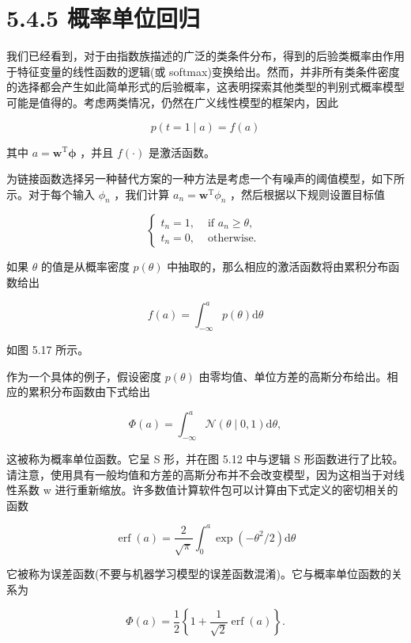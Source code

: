 \documentclass[10pt]{report}
\begin{document}
\section*{5.4.5 概率单位回归}

我们已经看到，对于由指数族描述的广泛的类条件分布，得到的后验类概率由作用于特征变量的线性函数的逻辑(或 softmax)变换给出。然而，并非所有类条件密度的选择都会产生如此简单形式的后验概率，这表明探索其他类型的判别式概率模型可能是值得的。考虑两类情况，仍然在广义线性模型的框架内，因此

\[
p\left( {t = 1 \mid  a}\right)  = f\left( a\right)  \tag{5.83}
\]

其中 \(a = {\mathbf{w}}^{\mathrm{T}}\mathbf{\phi }\) ，并且 \(f\left( \cdot \right)\) 是激活函数。

为链接函数选择另一种替代方案的一种方法是考虑一个有噪声的阈值模型，如下所示。对于每个输入 \({\phi }_{n}\) ，我们计算 \({a}_{n} = {\mathbf{w}}^{\mathrm{T}}{\phi }_{n}\) ，然后根据以下规则设置目标值

\[
\left\{  \begin{array}{ll} {t}_{n} = 1, & \text{ if }{a}_{n} \geq  \theta , \\  {t}_{n} = 0, & \text{ otherwise. } \end{array}\right.  \tag{5.84}
\]

如果 \(\theta\) 的值是从概率密度 \(p\left( \theta \right)\) 中抽取的，那么相应的激活函数将由累积分布函数给出

\[
f\left( a\right)  = {\int }_{-\infty }^{a}p\left( \theta \right) \mathrm{d}\theta  \tag{5.85}
\]

如图 5.17 所示。

作为一个具体的例子，假设密度 \(p\left( \theta \right)\) 由零均值、单位方差的高斯分布给出。相应的累积分布函数由下式给出

\[
\Phi \left( a\right)  = {\int }_{-\infty }^{a}\mathcal{N}\left( {\theta  \mid  0,1}\right) \mathrm{d}\theta , \tag{5.86}
\]

这被称为概率单位函数。它呈 S 形，并在图 5.12 中与逻辑 S 形函数进行了比较。请注意，使用具有一般均值和方差的高斯分布并不会改变模型，因为这相当于对线性系数 w 进行重新缩放。许多数值计算软件包可以计算由下式定义的密切相关的函数

\[
\operatorname{erf}\left( a\right)  = \frac{2}{\sqrt{\pi }}{\int }_{0}^{a}\exp \left( {-{\theta }^{2}/2}\right) \mathrm{d}\theta  \tag{5.87}
\]

它被称为误差函数(不要与机器学习模型的误差函数混淆)。它与概率单位函数的关系为

\[
\Phi \left( a\right)  = \frac{1}{2}\left\{  {1 + \frac{1}{\sqrt{2}}\operatorname{erf}\left( a\right) }\right\}  . \tag{5.88}
\]
\end{document}
